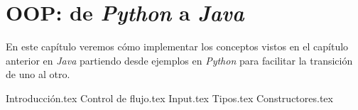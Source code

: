 \chapter{OOP: de \textit{Python} a \textit{Java}}
  En este capítulo veremos cómo implementar los conceptos vistos en el capítulo anterior 
  en \textit{Java} partiendo desde ejemplos en \textit{Python} para facilitar la 
  transición de uno al otro.

  {Introducción.tex}
  {Control de flujo.tex}
  {Input.tex}
  {Tipos.tex}
  {Constructores.tex}
%